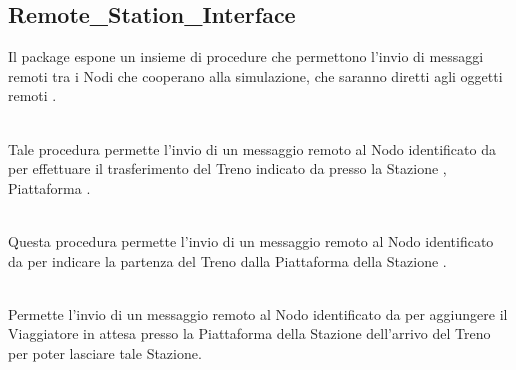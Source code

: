 	\subsection{Remote\_Station\_Interface}
	
	Il package  espone un insieme di procedure che permettono l'invio di messaggi remoti tra i Nodi che cooperano alla simulazione, che saranno diretti agli oggetti remoti .
	\begin{description}
		
		\item {}\\ 
			
		Tale procedura permette l'invio di un messaggio remoto al Nodo identificato da  per effettuare il trasferimento del Treno indicato da  presso la Stazione , Piattaforma . 
		
		\item {}\\ 
			
		Questa procedura permette l'invio di un messaggio remoto al Nodo identificato da  per indicare la partenza del Treno  dalla Piattaforma  della Stazione .
		
		\item {}\\
			
		Permette l'invio di un messaggio remoto al Nodo identificato da  per aggiungere il Viaggiatore  in attesa presso la Piattaforma  della Stazione  dell'arrivo del Treno  per poter lasciare tale Stazione.
		

\end{description}
